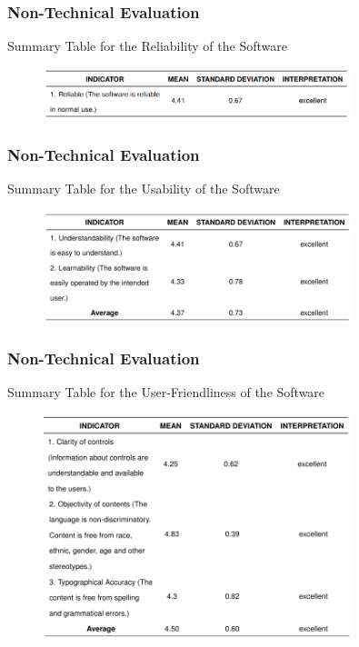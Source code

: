 \documentclass{beamer}
\begin{document}
\begin{frame}
	\frametitle{Non-Technical Evaluation}
	\begin{block}{Summary Table for the Reliability of the Software}
		\begin{figure}
			\includegraphics[width=0.8\textwidth]{figures/res_non_tech_reliability.png}
		\end{figure}
	\end{block}
\end{frame}

\begin{frame}
	\frametitle{Non-Technical Evaluation}
	\begin{block}{Summary Table for the Usability of the Software}
		\begin{figure}
			\includegraphics[width=0.8\textwidth]{figures/res_non_tech_usability.png}
		\end{figure}
	\end{block}
\end{frame}

\begin{frame}
	\frametitle{Non-Technical Evaluation}
	\begin{block}{Summary Table for the User-Friendliness of the Software}
		\begin{figure}
			\includegraphics[width=0.8\textwidth]{figures/res_non_tech_uf.png}
		\end{figure}
	\end{block}
\end{frame}
\end{document}
